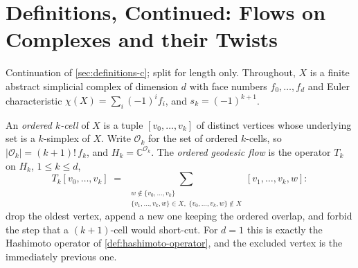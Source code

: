 
\section{Definitions, Continued: Flows on Complexes and their Twists}
\label{sec:definitions-d}

Continuation of \cref{sec:definitions-c}; split for length only. Throughout,
$X$ is a finite abstract simplicial complex of dimension $d$ with face numbers
$f_0,\dots,f_d$ and Euler characteristic $\chi(X) = \sum_i(-1)^if_i$, and
$s_k = (-1)^{k+1}$.

\begin{definition}
\label{def:ordered-geodesic-flow}
An \emph{ordered $k$-cell} of $X$ is a tuple $[v_0,\dots,v_k]$ of distinct
vertices whose underlying set is a $k$-simplex of $X$. Write $\mathcal O_k$ for
the set of ordered $k$-cells, so $|\mathcal O_k| = (k+1)!\,f_k$, and
$H_k = \mathbb C^{\mathcal O_k}$. The \emph{ordered geodesic flow} is the
operator $T_k$ on $H_k$, $1\le k\le d$,
\[
 T_k[v_0,\dots,v_k] \;=\; \sum_{\substack{w\notin\{v_0,\dots,v_k\}\\
 \{v_1,\dots,v_k,w\}\in X,\;\{v_0,\dots,v_k,w\}\notin X}} [v_1,\dots,v_k,w] :
\]
drop the oldest vertex, append a new one keeping the ordered overlap, and forbid
the step that a $(k+1)$-cell would short-cut. For $d=1$ this is exactly the
Hashimoto operator of \cref{def:hashimoto-operator}, and the excluded vertex is
the immediately previous one.
\end{definition}

